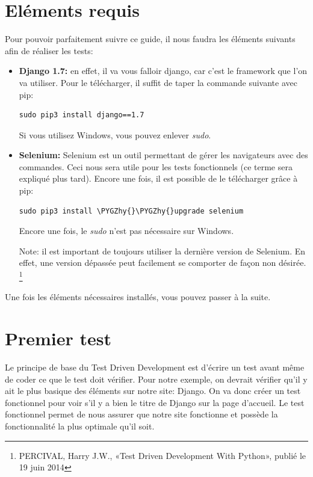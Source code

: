 \documentclass[letterpaper,10pt,french]{sphinxmanual}
\def\PYGZhy{\char`\-}
\begin{document}
\section{Eléments requis}
\label{projet1:elements-requis}
Pour pouvoir parfaitement suivre ce guide, il nous faudra les éléments suivants
afin de réaliser les tests:
\begin{itemize}
\item {} 
\textbf{Django 1.7:} en effet, il va vous falloir django, car c'est le framework
que l'on va utiliser. Pour le télécharger, il suffit de taper la commande
suivante avec pip:

\begin{Verbatim}[commandchars=\\\{\}]
sudo pip3 install django==1.7
\end{Verbatim}

Si vous utilisez Windows, vous pouvez enlever \emph{sudo}.

\item {} 
\textbf{Selenium:} Selenium est un outil permettant de gérer les navigateurs
avec des commandes. Ceci nous sera utile pour les tests fonctionnels (ce
terme sera expliqué plus tard). Encore une fois, il est possible de le
télécharger grâce à pip:

\begin{Verbatim}[commandchars=\\\{\}]
sudo pip3 install \PYGZhy{}\PYGZhy{}upgrade selenium
\end{Verbatim}

Encore une fois, le \emph{sudo} n'est pas nécessaire sur Windows.

Note: il est important de toujours utiliser la dernière version de Selenium.
En effet, une version dépassée peut facilement se comporter de façon non
désirée. \footnote{
PERCIVAL, Harry J.W., «Test Driven Development With Python», publié
le 19 juin 2014
}

\end{itemize}

Une fois les éléments nécessaires installés, vous pouvez passer à la suite.


\section{Premier test}
\label{projet1:premier-test}
Le principe de base du Test Driven Development est d'écrire un test avant même
de coder ce que le test doit vérifier. Pour notre exemple, on devrait vérifier
qu'il y ait le plus basique des éléments sur notre site: Django. On va donc
créer un test fonctionnel pour voir s'il y a bien le titre de Django sur la page
d'accueil. Le test fonctionnel permet de nous assurer que notre site fonctionne
et possède la fonctionnalité la plus optimale qu'il soit.
\end{document}
